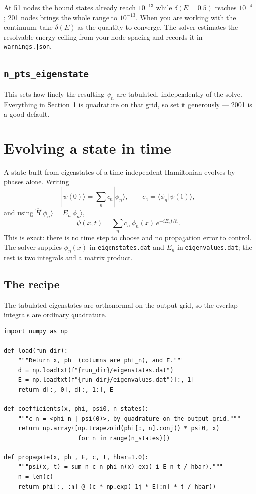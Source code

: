 \documentclass[11pt]{article}
\newcommand{\file}[1]{\texttt{#1}}
\newcommand{\ket}[1]{| #1 \rangle}
\newcommand{\braket}[2]{\langle #1 | #2 \rangle}
\begin{document}
At 51 nodes the bound states already reach $10^{-13}$ while $\delta(E{=}0.5)$
reaches $10^{-4}$; 201 nodes brings the whole range to $10^{-13}$. When you are
working with the continuum, take $\delta(E)$ as the quantity to converge. The
solver estimates the resolvable energy ceiling from your node spacing and
records it in \file{warnings.json}.

\subsection{\texttt{n\_pts\_eigenstate}}

This sets how finely the resulting $\psi_n$ are tabulated, independently of the
solve. Everything in Section~\ref{sec:evolution} is quadrature on that grid, so
set it generously --- 2001 is a good default.

\section{Evolving a state in time}
\label{sec:evolution}

A state built from eigenstates of a time-independent Hamiltonian evolves by
phases alone. Writing
\begin{equation}
  \ket{\psi(0)} = \sum_n c_n \ket{\phi_n},
  \qquad c_n = \braket{\phi_n}{\psi(0)},
\end{equation}
and using $\hat H \ket{\phi_n} = E_n \ket{\phi_n}$,
\begin{equation}
  \boxed{\;
  \psi(x,t) = \sum_n c_n\, \phi_n(x)\, e^{-i E_n t/\hbar}.
  \;}
  \label{eq:spectral}
\end{equation}
This is exact: there is no time step to choose and no propagation error to
control. The solver supplies $\phi_n(x)$ in \file{eigenstates.dat} and $E_n$ in
\file{eigenvalues.dat}; the rest is two integrals and a matrix product.

\subsection{The recipe}

The tabulated eigenstates are orthonormal on the output grid, so the overlap
integrals are ordinary quadrature.

\begin{lstlisting}[style=py,caption={A complete spectral-propagation helper.}]
import numpy as np

def load(run_dir):
    """Return x, phi (columns are phi_n), and E."""
    d = np.loadtxt(f"{run_dir}/eigenstates.dat")
    E = np.loadtxt(f"{run_dir}/eigenvalues.dat")[:, 1]
    return d[:, 0], d[:, 1:], E

def coefficients(x, phi, psi0, n_states):
    """c_n = <phi_n | psi(0)>, by quadrature on the output grid."""
    return np.array([np.trapezoid(phi[:, n].conj() * psi0, x)
                     for n in range(n_states)])

def propagate(x, phi, E, c, t, hbar=1.0):
    """psi(x, t) = sum_n c_n phi_n(x) exp(-i E_n t / hbar)."""
    n = len(c)
    return phi[:, :n] @ (c * np.exp(-1j * E[:n] * t / hbar))
\end{lstlisting}
\end{document}
